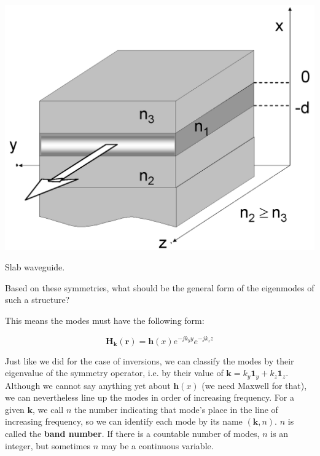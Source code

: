 \begin{marginfigure}
\centering
\includegraphics{symmetry/figures/slabwg}
\caption{Slab waveguide.}
\label{fig-slab-wg}
\end{marginfigure}

\begin{cue}
Based on these symmetries, what should be the general form of the eigenmodes of such a structure?
\end{cue}

This means the modes must have the following form:

\begin{equation}
{\mathbf H}_{\mathbf k}({\mathbf r}) = {\mathbf h}(x) e^{-j k_y y} e^{-j k_z z} 
\end{equation} 

Just like we did for the case of inversions, we can classify the modes by their eigenvalue of the symmetry operator, i.e. by their value of ${\mathbf k} = k_y {\mathbf 1}_y + k_z {\mathbf 1}_z$. Although we cannot say anything yet about ${\mathbf h}(x)$ (we need Maxwell for that), we can nevertheless line up the modes in order of increasing frequency. For a given ${\mathbf k}$, we call $n$ the number indicating that mode's place in the line of increasing frequency, so we can identify each mode by its name $({\mathbf k},n)$.
$n$ is called the \textbf{band number}. If there is a countable number of modes, $n$ is an integer, but sometimes $n$ may be a continuous variable. 

